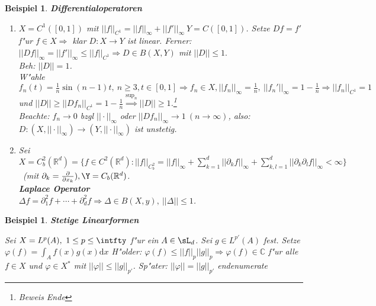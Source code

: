\documentclass[a4paper,11pt]{book}
\newcommand{\R}{{\mathbb R}}
\newcommand{\C}{{\mathbb C}}
\newcommand{\d}{\mbox{d}}
\newcommand{\sn}[1]{||#1||_{\infty}}
\def\d{\mbox{d}}
\newtheorem{Bsp}[Def]{Beispiel}
\theoremstyle{nonumberplain}
\begin{document}
\begin{Bsp}
\textbf{Differentialoperatoren}
\begin{enumerate}
\item[a)] $X = C^1([0,1])$ mit $||f||_{C^1} = \sn{f} + \sn{f'} \ Y = C([0,1])$. Setze $Df = f'$ f"ur $f \in X \Rightarrow$ klar $D: X \rightarrow Y$ ist linear. Ferner: $\sn{Df} = \sn{f'} \leq ||f||_{C^1} \Rightarrow D \in B(X,Y)$ mit $||D|| \leq 1.$\\
\emph{Beh:} $||D|| = 1$.\\
W"ahle $f_n(t) = \frac1{n} \sin(n-1)t,\ n \geq 3, t \in [0,1] \Rightarrow f_n \in X, \sn{f_n} = \frac1{n}, \ \sn{f_n'} = 1 - \frac1{n} \Rightarrow ||f_n||_{C^1} = 1$ und $||D|| \geq ||Df_n||_{C^1} = 1 - \frac1{n} \stackrel{\sup_n}{\Rightarrow} ||D|| \geq 1$.\footnote{Beweis Ende}\\
Beachte: $f_n \rightarrow 0$ bzgl $\sn{\cdot}$ oder $\sn{Df_n} \rightarrow 1 \ (n \rightarrow \infty)$, also: $D: (X, \sn{\cdot}) \rightarrow (Y, \sn{\cdot})$ ist unstetig.
\item[b)] Sei $X = C_b^2(\R^d) = \{ f \in C^2(\R^d): ||f||_{C_b^2} = \sn{f} + \sum_{k=1}^d \sn{\partial_k f} + \sum_{k,l=1}^d \sn{\partial_k \partial_l f} < \infty \}$ \ (mit $\partial_k =\frac{\partial}{\partial x_k}), \Y = C_b(\R^d)$.\\
\textbf{Laplace Operator}\\
$\Delta f = \partial_1^2 f + \cdots + \partial_d^2 f \Rightarrow \Delta \in B(X,y),\ ||\Delta|| \leq 1$.
\end{enumerate}
\end{Bsp}

\begin{Bsp}
\textbf{Stetige Linearformen}
\item[b)] Sei $X = L^p(A),\ 1 \leq p \leq \intfty$ f"ur ein $A \in \sL_d$. Sei $g \in L^{p'}(A)$ fest. Setze $\varphi(f) = \int_A f(x)g(x)\d x$ H"older: $\varphi(f) \leq ||f||_p ||g||_p \Rightarrow \varphi(f) \in \C$ f"ur alle $f \in X$ und $\varphi \in X^{\ast}$ mit $||\varphi|| \leq ||g||_{p'}$. Sp"ater: $||\varphi|| = ||g||_{p'}$
end{enumerate}
\end{Bsp}
\end{document}
